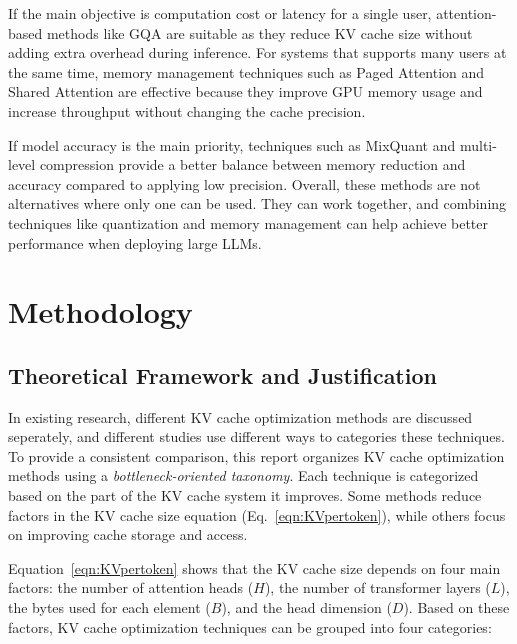 \documentclass[conference]{IEEEtran}
\begin{document}
If the main objective is computation cost or latency for a single user, attention-based methods like GQA are suitable as they reduce KV cache size without adding extra overhead during inference. For systems that supports many users at the same time, memory management techniques such as Paged Attention and Shared Attention are effective because they improve GPU memory usage and increase throughput without changing the cache precision.

If model accuracy is the main priority, techniques such as MixQuant and multi-level compression provide a better balance between memory reduction and accuracy compared to applying low precision. Overall, these methods are not alternatives where only one can be used. They can work together, and combining techniques like quantization and memory management can help achieve better performance when deploying large LLMs.

\section{Methodology}
\subsection{Theoretical Framework and Justification}

In existing research, different KV cache optimization methods are discussed seperately, and different studies use different ways to categories these techniques. To provide a consistent comparison, this report organizes KV cache optimization methods using a \textit{bottleneck-oriented taxonomy}. Each technique is categorized based on the part of the KV cache system it improves. Some methods reduce factors in the KV cache size equation (Eq.~\eqref{eqn:KVpertoken}), while others focus on improving cache storage and access.

Equation~\eqref{eqn:KVpertoken} shows that the KV cache size depends on four main factors: the number of attention heads ($H$), the number of transformer layers ($L$), the bytes used for each element ($B$), and the head dimension ($D$). Based on these factors, KV cache optimization techniques can be grouped into four categories:
\end{document}
